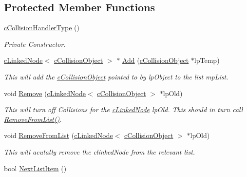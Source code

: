 \subsection*{Protected Member Functions}
\begin{DoxyCompactItemize}
\item 
\hyperlink{classc_collision_handler_type_a90fce7fe5fee0c544b0d19f9077fc402}{cCollisionHandlerType} ()
\begin{DoxyCompactList}\small\item\em Private Constructor. \item\end{DoxyCompactList}\item 
\hyperlink{classc_linked_node}{cLinkedNode}$<$ \hyperlink{classc_collision_object}{cCollisionObject} $>$ $\ast$ \hyperlink{classc_collision_handler_type_ae2229ae307688f4a8f6ea7d41621e1e6}{Add} (\hyperlink{classc_collision_object}{cCollisionObject} $\ast$lpTemp)
\begin{DoxyCompactList}\small\item\em This will add the \hyperlink{classc_collision_object}{cCollisionObject} pointed to by lpObject to the list mpList. \item\end{DoxyCompactList}\item 
void \hyperlink{classc_collision_handler_type_a7c1606ae3858a38d90e8db5e4080adda}{Remove} (\hyperlink{classc_linked_node}{cLinkedNode}$<$ \hyperlink{classc_collision_object}{cCollisionObject} $>$ $\ast$lpOld)
\begin{DoxyCompactList}\small\item\em This will turn off Collisions for the \hyperlink{classc_linked_node}{cLinkedNode} lpOld. This should in turn call \hyperlink{classc_collision_handler_type_ae1fae66c56488c1a7920d2394e127f2e}{RemoveFromList()}. \item\end{DoxyCompactList}\item 
void \hyperlink{classc_collision_handler_type_ae1fae66c56488c1a7920d2394e127f2e}{RemoveFromList} (\hyperlink{classc_linked_node}{cLinkedNode}$<$ \hyperlink{classc_collision_object}{cCollisionObject} $>$ $\ast$lpOld)
\begin{DoxyCompactList}\small\item\em This will acutally remove the clinkedNode from the relevant list. \item\end{DoxyCompactList}\item 
bool \hyperlink{classc_collision_handler_type_ace66f4067d9117ce379eb84d3afd2fa7}{NextListItem} ()

\end{DoxyCompactItemize}
